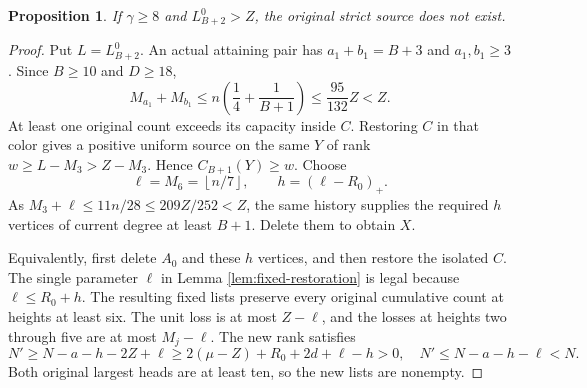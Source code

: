 \documentclass[11pt,a4paper]{article}
\newcommand{\floor}[1]{\left\lfloor#1\right\rfloor}
\newtheorem{proposition}[theorem]{Proposition}
\theoremstyle{definition}
\begin{document}
\begin{proposition}\label{prop:largegap-high}
If $\gamma\ge8$ and $L_{B+2}^0>Z$, the original strict source does not exist.
\end{proposition}
\begin{proof}
Put $L=L_{B+2}^0$. An actual attaining pair has
$a_1+b_1=B+3$ and $a_1,b_1\ge3$. Since $B\ge10$ and $D\ge18$,
\[
M_{a_1}+M_{b_1}\le n\left(\frac14+\frac1{B+1}\right)
\le\frac{95}{132}Z<Z.
\]
At least one original count exceeds its capacity inside $C$. Restoring $C$ in that color gives a positive uniform source on the same $Y$ of rank $w\ge L-M_3>Z-M_3$. Hence $C_{B+1}(Y)\ge w$.
Choose
\[
\ell=M_6=\floor{n/7},\qquad h=(\ell-R_0)_+.
\]
As $M_3+\ell\le11n/28\le209Z/252<Z$, the same history supplies the required $h$ vertices of current degree at least $B+1$. Delete them to obtain $X$.

Equivalently, first delete $A_0$ and these $h$ vertices, and then restore the isolated $C$. The single parameter $\ell$ in Lemma \ref{lem:fixed-restoration} is legal because $\ell\le R_0+h$. The resulting fixed lists preserve every original cumulative count at heights at least six. The unit loss is at most $Z-\ell$, and the losses at heights two through five are at most $M_j-\ell$. The new rank satisfies
\[
N'\ge N-a-h-2Z+\ell
\ge2(\mu-Z)+R_0+2d+\ell-h>0,
\quad N'\le N-a-h-\ell<N.
\]
Both original largest heads are at least ten, so the new lists are nonempty.


\end{proof}
\end{document}
